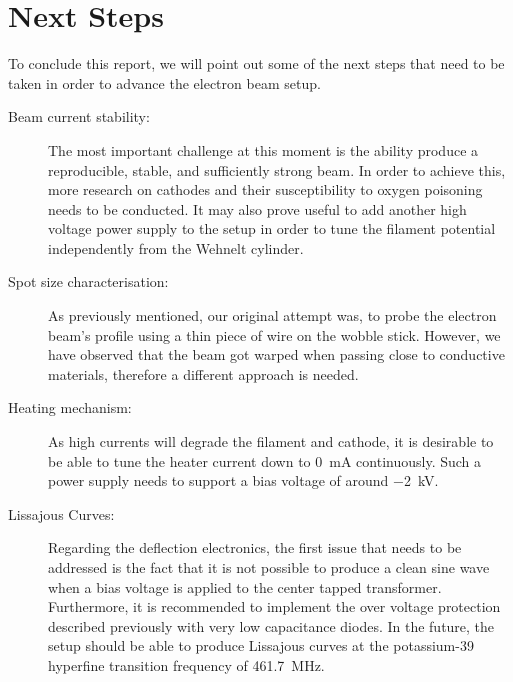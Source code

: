 
\chapter{Next Steps}

To conclude this report, we will point out some of the next steps that need to be taken in order to advance the electron beam setup. 

\begin{description}
	\item[Beam current stability:] The most important challenge at this moment is the ability produce a reproducible, stable, and sufficiently strong beam. In order to achieve this, more research on cathodes and their susceptibility to oxygen poisoning needs to be conducted. It may also prove useful to add another high voltage power supply to the setup in order to tune the filament potential independently from the Wehnelt cylinder. 
	\item[Spot size characterisation:] As previously mentioned, our original attempt was, to probe the electron beam's profile using a thin piece of wire on the wobble stick. However, we have observed that the beam got warped when passing close to conductive materials, therefore a different approach is needed. 
	\item[Heating mechanism:] As high currents will degrade the filament and cathode, it is desirable to be able to tune the heater current down to \SI{0}{\milli\ampere} continuously. Such a power supply needs to support a bias voltage of around \SI{-2}{\kilo\volt}. 
	\item[Lissajous Curves:] Regarding the deflection electronics, the first issue that needs to be addressed is the fact that it is not possible to produce a clean sine wave when a bias voltage is applied to  the center tapped transformer. Furthermore, it is recommended to implement the over voltage protection described previously with very low capacitance diodes.  
	In the future, the setup should be able to produce Lissajous curves at the potassium-39 hyperfine transition frequency of \SI{461.7}{\mega\hertz}. 
\end{description}